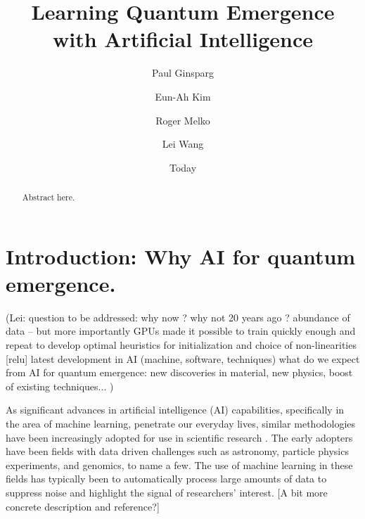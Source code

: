 \documentclass[aps,prb,floatfix,amsmath,amssymb,amsfonts,10pt,floatfix,longbibliography]{revtex4-1}
\begin{document}
\title{Learning Quantum Emergence with Artificial Intelligence}
\author{Paul Ginsparg}  %
\author{Eun-Ah Kim}
\author{Roger Melko}
\author{Lei Wang}

\date{Today}
\begin{abstract}
Abstract here.
\end{abstract}
\maketitle


\tableofcontents
\newpage



\section{Introduction: Why AI for quantum emergence.}

(Lei: question to be addressed: why now ? why not 20 years ago ? 
abundance of data  -- but more importantly GPUs made it possible to train quickly enough and repeat to develop optimal heuristics for initialization and choice of non-linearities [relu]
latest development in AI (machine, software, techniques)
what do we expect from AI for quantum emergence: new discoveries in material, new physics, boost of existing techniques... 
) 

As significant advances in artificial intelligence (AI) capabilities, specifically in the area of machine learning, penetrate our everyday lives, similar methodologies have been increasingly adopted for use in scientific research \cite{Zdeborova2017}. The early adopters have been fields with data driven challenges such as astronomy, particle physics experiments, and genomics, to name a few. The use of machine learning in these fields has typically been to automatically process large amounts of data to suppress noise and highlight the signal of researchers' interest. [A bit more concrete description and reference?]
\end{document}
